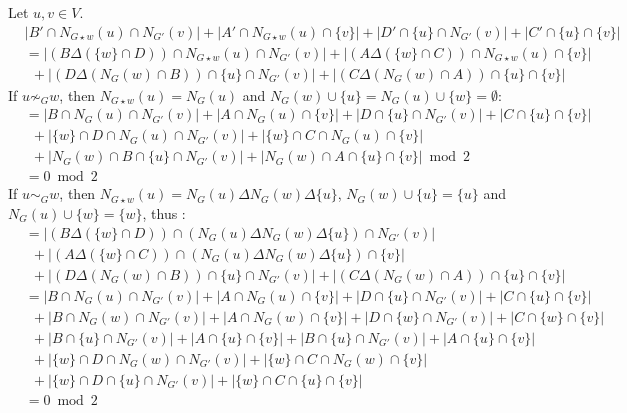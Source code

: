\documentclass[a4paper,UKenglish,cleveref,autoref,thm-restate]{arxiv}
\begin{document}
Let $u,v \in V$.
\begin{align*}
    & |B'\cap N_{G \star w}(u)\cap N_{G'}(v)| + |A'\cap N_{G \star w}(u)\cap \{v\}| +  |D'\cap \{u\}\cap N_{G'}(v)| + |C'\cap \{u\}\cap \{v\}|\\
    &=|(B \Delta ( \{w\}\cap D))\cap N_{G \star w}(u)\cap N_{G'}(v)| + |(A \Delta ( \{w\}\cap C))\cap N_{G \star w}(u)\cap \{v\}|\\
    &~~+ |(D \Delta ( N_{G}(w)\cap B))\cap \{u\}\cap N_{G'}(v)| + |(C \Delta ( N_{G}(w)\cap A))\cap \{u\}\cap \{v\}|
\end{align*}
If $u\not\sim_{G} w$, then $N_{G \star w}(u) = N_{G}(u)$ and $N_G(w)\cup \{u\} = N_G(u)\cup \{w\} = \emptyset$:
\begin{align*}
    &= |B\cap N_G(u)\cap N_{G'}(v)| + |A\cap N_G(u)\cap \{v\}| +  |D\cap \{u\}\cap N_{G'}(v)| + |C\cap \{u\}\cap \{v\}|\\
    &~~+ | \{w\}\cap D\cap N_G(u)\cap N_{G'}(v)| + |\{w\}\cap C\cap N_G(u)\cap \{v\}|\\
    &~~+ |N_{G}(w)\cap B\cap \{u\}\cap N_{G'}(v)| + |N_{G}(w)\cap A \cap \{u\}\cap \{v\}| \bmod 2\\
    &= 0 \bmod 2
\end{align*}
If $u\sim_{G} w$, then $N_{G \star w}(u) = N_{G}(u) \Delta N_{G}(w) \Delta \{u\}$, $N_G(w)\cup \{u\} = \{u\}$ and $N_G(u)\cup \{w\} = \{w\}$, thus :
\begin{align*}
    &=|(B \Delta ( \{w\}\cap D))\cap (N_{G}(u) \Delta N_{G}(w) \Delta \{u\})\cap N_{G'}(v)|\\
    &~~+ |(A \Delta ( \{w\}\cap C))\cap (N_{G}(u) \Delta N_{G}(w) \Delta \{u\})\cap \{v\}|\\
    &~~+ |(D \Delta ( N_{G}(w)\cap B))\cap \{u\}\cap N_{G'}(v)| + |(C \Delta ( N_{G}(w)\cap A))\cap \{u\}\cap \{v\}|\\
    &= |B\cap N_G(u)\cap N_{G'}(v)| + |A\cap N_G(u)\cap \{v\}| +  |D\cap \{u\}\cap N_{G'}(v)| + |C\cap \{u\}\cap \{v\}|\\
    &~~+|B\cap N_G(w)\cap N_{G'}(v)| + |A\cap N_G(w)\cap \{v\}| +  |D\cap \{w\}\cap N_{G'}(v)| + |C\cap \{w\}\cap \{v\}|\\
    &~~+|B\cap\{u\}\cap N_{G'}(v)|+|A\cap\{u\}\cap\{v\}|+|B\cap\{u\}\cap N_{G'}(v)|+|A\cap\{u\}\cap \{v\}|\\
    &~~+ |\{w\} \cap D \cap N_G(w) \cap N_{G'}(v)| + |\{w\} \cap C \cap N_G(w) \cap \{v\}|\\
    &~~+ |\{w\} \cap D \cap \{u\} \cap N_{G'}(v)| + |\{w\} \cap C \cap \{u\}\cap \{v\}|\\
    &= 0 \bmod 2
\end{align*}
\end{document}
